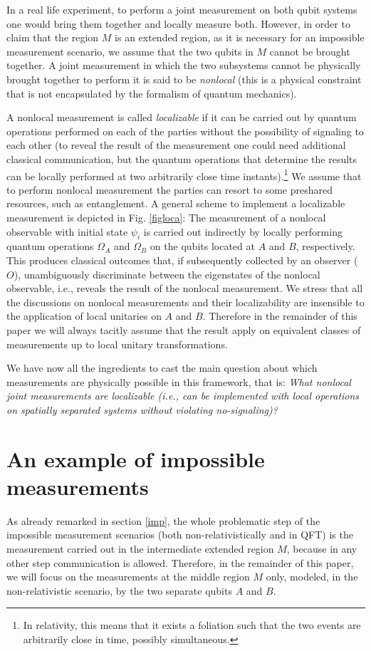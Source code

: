 \documentclass[12pt]{article}
\begin{document}
In a real life experiment, to perform a joint measurement on both qubit systems one would bring them together and locally measure both. However,  in order to claim that the region $M$   is an extended region, as it is necessary for an impossible measurement scenario, we assume that the two qubits in $M$ cannot be brought together. A joint measurement in which the two subsystems cannot be physically brought together to perform it is said to be  \textit{nonlocal} (this is a physical constraint that is not encapsulated by the formalism of quantum mechanics). 

A nonlocal measurement is called \textit{localizable} if it can be carried out  by quantum operations performed on each of the parties without the possibility of signaling to each other (to reveal the result of the measurement one could need additional  classical communication, but the quantum operations that determine the results can be locally performed at two arbitrarily close time instants).\footnote{In relativity, this means that it exists a foliation such that the two events are arbitrarily close in time, possibly simultaneous.} We assume that to perform nonlocal measurement the parties can resort to some preshared resources, such as entanglement. A general scheme to implement a localizable measurement is depicted in Fig. \ref{figloca}: The measurement of a nonlocal observable with initial state $\psi_i$ is carried out indirectly by locally performing quantum operations $\Omega_{A}$ and $\Omega_{B}$ on the qubits located at $A$ and $B$, respectively. This produces classical outcomes that, if subsequently collected by an observer ($O$), unambiguously discriminate between the eigenstates of the nonlocal observable, i.e., reveals the result of the nonlocal measurement. 
We stress that all the discussions on nonlocal measurements and their localizability are insensible to the application of local unitaries on $A$ and $B$. Therefore in the remainder of this paper we will always tacitly assume that the result apply on equivalent classes of measurements up to local unitary transformations.


We have now all the ingredients to cast the main question about which measurements are physically possible in this framework, that is: 
\textit{What nonlocal joint measurements are localizable (i.e., can be implemented with local operations on spatially separated systems without violating no-signaling)?
}


\section{An example of impossible measurements}
\label{example}
As already remarked in section \ref{imp}, the whole problematic step of the impossible measurement scenarios (both non-relativistically and in QFT) is the measurement carried out in the intermediate extended region $M$, because in any other step communication is allowed. Therefore, in the remainder of this paper, we will focus on the measurements at the middle region $M$ only, modeled, in the non-relativistic scenario,  by the  two separate qubits $A$ and $B$.
\end{document}
